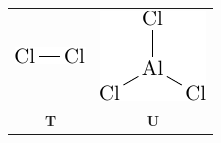 \documentclass{article}
\begin{document}
	\begin{tabular}{cc}
		\includegraphics{subfigures/cl2.pdf} & \includegraphics{subfigures/aluminum-chloride.pdf} \\
		\textbf{T} & \textbf{U}
	\end{tabular}
\end{document}
